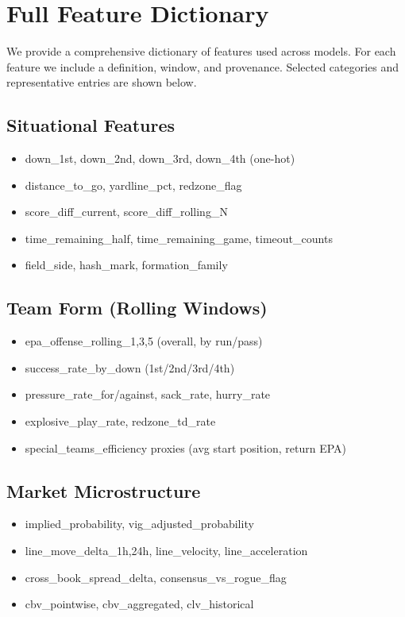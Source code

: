 \documentclass[12pt]{report}  %
\numberwithin{equation}{section}
\theoremstyle{plain}
\theoremstyle{definition}
\theoremstyle{remark}
\begin{document}
\chapter{Full Feature Dictionary}
We provide a comprehensive dictionary of features used across models. For each feature we include a definition, window, and provenance. Selected categories and representative entries are shown below.

\section{Situational Features}
\begin{itemize}
  \item down\_1st, down\_2nd, down\_3rd, down\_4th (one-hot)
  \item distance\_to\_go, yardline\_pct, redzone\_flag
  \item score\_diff\_current, score\_diff\_rolling\_N
  \item time\_remaining\_half, time\_remaining\_game, timeout\_counts
  \item field\_side, hash\_mark, formation\_family
\end{itemize}

\section{Team Form (Rolling Windows)}
\begin{itemize}
  \item epa\_offense\_rolling\_{1,3,5} (overall, by run/pass)
  \item success\_rate\_by\_down (1st/2nd/3rd/4th)
  \item pressure\_rate\_for/against, sack\_rate, hurry\_rate
  \item explosive\_play\_rate, redzone\_td\_rate
  \item special\_teams\_efficiency proxies (avg start position, return EPA)
\end{itemize}

\section{Market Microstructure}
\begin{itemize}
  \item implied\_probability, vig\_adjusted\_probability
  \item line\_move\_delta\_{1h,24h}, line\_velocity, line\_acceleration
  \item cross\_book\_spread\_delta, consensus\_vs\_rogue\_flag
  \item cbv\_pointwise, cbv\_aggregated, clv\_historical
\end{itemize}
\end{document}
